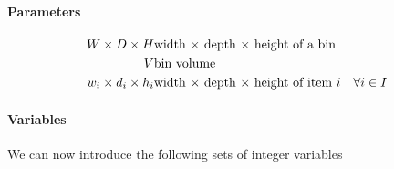 \paragraph*{Parameters}
\begin{eqnarray}
          W \times D \times H  & \text{width $\times$ depth $\times$ height of a bin} \notag \\
                            V  & \text{bin volume} \notag \\
    w_i \times d_i \times h_i  & \text{width $\times$ depth $\times$ height of item $i$} & \forall i \in I \label{par:item_dim}
\end{eqnarray}

\paragraph*{Variables} We can now introduce the following sets of integer variables
